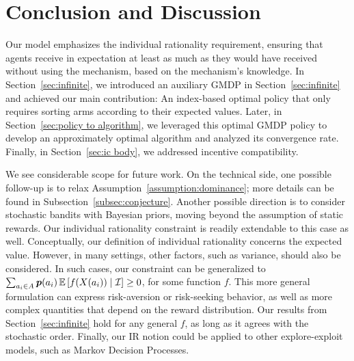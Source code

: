 \section{Conclusion and Discussion}\label{sec:discussion}
Our model emphasizes the individual rationality requirement, ensuring that agents receive in expectation at least as much as they would have received without using the mechanism, based on the mechanism's knowledge. %
In Section~\ref{sec:infinite}, we introduced an auxiliary GMDP in Section~\ref{sec:infinite} and achieved our main contribution: An index-based optimal policy that only requires sorting arms according to their expected values. Later, in Section~\ref{sec:policy to algorithm}, we leveraged this optimal GMDP policy to develop an approximately optimal algorithm and analyzed its convergence rate. Finally, in Section~\ref{sec:ic body}, we addressed incentive compatibility.


We see considerable scope for future work. On the technical side, one possible follow-up is to relax Assumption~\ref{assumption:dominance}; more details can be found in Subsection~\ref{subsec:conjecture}. Another possible direction is to consider stochastic bandits with Bayesian priors, moving beyond the assumption of static rewards. Our individual rationality constraint is readily extendable to this case as well. Conceptually, our definition of individual rationality concerns the expected value. However, in many settings, other factors, such as variance, should also be considered. In such cases, our constraint can be generalized to $\sum_{a_i\in A}\boldsymbol{ p } (a_i)\operatorname{\mathbb{E}}\left[f(X(a_i))\mid \mathcal{I}\right]\geq 0$, for some function $f$. This more general formulation can express risk-aversion or risk-seeking behavior, as well as more complex quantities that depend on the reward distribution. Our results from Section~\ref{sec:infinite} hold for any general $f$, as long as it agrees with the stochastic order. Finally, our IR notion could be applied to other explore-exploit models, such as Markov Decision Processes.



